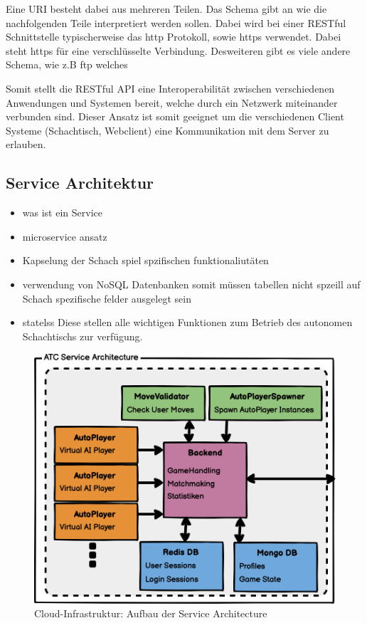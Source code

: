 Eine URI besteht dabei aus mehreren Teilen. Das Schema gibt an wie die
nachfolgenden Teile interpretiert werden sollen. Dabei wird bei einer
RESTful Schnittstelle typischerweise das \gls{http} Protokoll, sowie
\gls{https} verwendet. Dabei steht \gls{https} für eine verschlüsselte
Verbindung. Desweiteren gibt es viele andere Schema, wie z.B \gls{ftp}
welches

Somit stellt die RESTful API eine Interoperabilität zwischen
verschiedenen Anwendungen und Systemen bereit, welche durch ein Netzwerk
miteinander verbunden sind. Dieser Ansatz ist somit geeignet um die
verschiedenen Client Systeme (Schachtisch, Webclient) eine Kommunikation
mit dem Server zu erlauben.

\hypertarget{service-architektur}{%
\subsection{Service Architektur}\label{service-architektur}}

\begin{itemize}
\tightlist
\item
  was ist ein Service
\item
  microservice ansatz
\item
  Kapselung der Schach spiel spzifischen funktionaliutäten
\item
  verwendung von NoSQL Datenbanken somit müssen tabellen nicht spzeill
  auf Schach spezifische felder ausgelegt sein
\item
  statelss Diese stellen alle wichtigen Funktionen zum Betrieb des
  autonomen Schachtischs zur verfügung.
\end{itemize}

\begin{figure}
\centering
\includegraphics{images/ATC_Service_Architecture.png}
\caption{Cloud-Infrastruktur: Aufbau der Service Architecture}
\end{figure}

